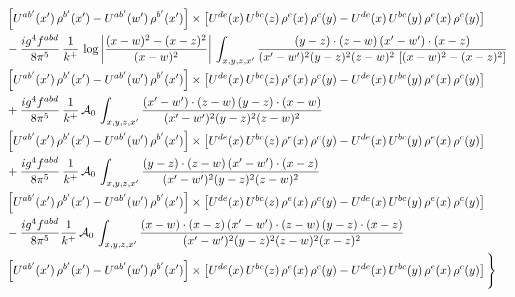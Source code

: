 \documentclass[9pt]{article}
\numberwithin{equation}{section}
\begin{document}
\begin{align}
& \left[U^{ab'}(x')\,\rho^{b'}(x')-U^{ab'}(w')\, \rho^{b'}(x')\right]\times \left[U^{de}(x)\,U^{bc}(z)\, \rho^{e}(x)\,\rho^{c}(y)-U^{de}(x)\,U^{bc}(y)\,\rho^{e}(x)\,\rho^{c}(y)\right] \notag \\
& -\frac{ig^{4}f^{abd}}{8\pi^{5}}\,\frac{1}{k^{+}}\,\log{\left|\frac{(x-w)^{2}-(x-z)^{2}}{(x-w)^{2}}\right|}\,\int_{x,y,z,x'}
\frac{(y-z)\cdot(z-w)\,(x'-w')\cdot(x-z)}{(x'-w')^{2}(y-z)^{2}(z-w)^{2}\,\left[(x-w)^{2}-(x-z)^{2}\right]}\notag \\ & \left[U^{ab'}(x')\,\rho^{b'}(x')-U^{ab'}(w')\, \rho^{b'}(x')\right]\times \left[U^{de}(x)\,U^{bc}(z)\, \rho^{e}(x)\,\rho^{c}(y)-U^{de}(x)\,U^{bc}(y)\,\rho^{e}(x)\,\rho^{c}(y)\right] \notag \\
& +\frac{ig^{4}f^{abd}}{8\pi^{5}}\,\frac{1}{k^{+}}\,\mathcal{A}_{0}\,\int_{x,y,z,x'}
\frac{(x'-w')\cdot(z-w)\,(y-z)\cdot(x-w)}{(x'-w')^{2}(y-z)^{2}(z-w)^{2}}\notag \\
& \left[U^{ab'}(x')\,\rho^{b'}(x')-U^{ab'}(w')\, \rho^{b'}(x')\right]\times \left[U^{de}(x)\,U^{bc}(z)\, \rho^{e}(x)\,\rho^{c}(y)-U^{de}(x)\,U^{bc}(y)\,\rho^{e}(x)\,\rho^{c}(y)\right] \notag \\
& +\frac{ig^{4}f^{abd}}{8\pi^{5}}\,\frac{1}{k^{+}}\,\mathcal{A}_{0}\,\int_{x,y,z,x'}
\frac{(y-z)\cdot(z-w)\,(x'-w')\cdot(x-z)}{(x'-w')^{2}(y-z)^{2}(z-w)^{2}}\notag \\ & \left[U^{ab'}(x')\,\rho^{b'}(x')-U^{ab'}(w')\, \rho^{b'}(x')\right]\times \left[U^{de}(x)\,U^{bc}(z)\, \rho^{e}(x)\,\rho^{c}(y)-U^{de}(x)\,U^{bc}(y)\,\rho^{e}(x)\,\rho^{c}(y)\right] \notag \\
& -\frac{ig^{4}f^{abd}}{8\pi^{5}}\frac{1}{k^{+}}\,\mathcal{A}_{0}\,\int_{x,y,z,x'}
\frac{(x-w)\cdot(x-z)\,(x'-w')\cdot(z-w)\,(y-z)\cdot(x-z)}{(x'-w')^{2}(y-z)^{2}(z-w)^{2}(x-z)^{2}}\notag \\ & \left[U^{ab'}(x')\,\rho^{b'}(x')-U^{ab'}(w')\, \rho^{b'}(x')\right]\times \left[U^{de}(x)\,U^{bc}(z)\, \rho^{e}(x)\,\rho^{c}(y)-U^{de}(x)\,U^{bc}(y)\,\rho^{e}(x)\,\rho^{c}(y)\right]\Bigg\}
\end{align}
\end{document}
